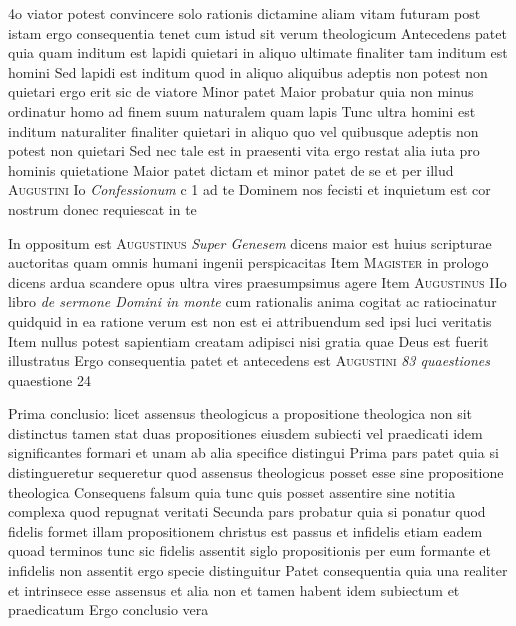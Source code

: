 \documentclass[twoside, openright]{article}
\newcommand{\name}[1]{\textsc{#1}}
\newcommand{\worktitle}[1]{\textit{#1}}
\begin{document}
        \pstart
        4o viator potest convincere solo rationis dictamine aliam vitam futuram post istam ergo consequentia tenet cum istud sit verum theologicum Antecedens patet quia quam inditum est lapidi quietari in aliquo ultimate finaliter tam inditum est homini Sed lapidi est inditum quod in aliquo aliquibus adeptis non potest non quietari ergo erit sic de viatore Minor patet Maior probatur quia non minus ordinatur homo ad finem suum naturalem quam lapis Tunc ultra homini est inditum naturaliter finaliter quietari in aliquo quo vel quibusque adeptis non potest non quietari Sed nec tale est in praesenti vita ergo restat alia iuta pro hominis quietatione Maior patet dictam et minor patet de se et per illud \name{Augustini} Io \worktitle{Confessionum} c 1 ad te Dominem nos fecisti et inquietum est cor nostrum donec requiescat in te
        \pend
     
        \pstart
        In oppositum est \name{Augustinus} \worktitle{Super Genesem}\index[works]{} dicens maior est huius scripturae auctoritas quam omnis humani ingenii perspicacitas Item \name{Magister} in prologo dicens ardua scandere opus ultra vires praesumpsimus agere Item \name{Augustinus} IIo libro \worktitle{de sermone Domini in monte}\index[works]{} cum rationalis anima cogitat ac ratiocinatur quidquid in ea ratione verum est non est ei attribuendum sed ipsi luci veritatis Item nullus potest sapientiam creatam adipisci nisi gratia quae Deus est fuerit illustratus Ergo consequentia patet et antecedens est \name{Augustini} \worktitle{83 quaestiones} quaestione 24
        \pend
     
        \pstart
        Prima conclusio: licet assensus theologicus a propositione theologica non sit distinctus tamen stat duas propositiones eiusdem subiecti vel praedicati idem significantes formari et unam ab alia specifice distingui Prima pars patet quia si distingueretur sequeretur quod assensus theologicus posset esse sine propositione theologica Consequens falsum quia tunc quis posset assentire sine notitia complexa quod repugnat veritati Secunda pars probatur quia si ponatur quod fidelis formet illam propositionem christus est passus et infidelis etiam eadem quoad terminos tunc sic fidelis assentit siglo propositionis per eum formante et infidelis non assentit ergo specie distinguitur Patet consequentia quia una realiter et intrinsece esse assensus et alia non et tamen habent idem subiectum et praedicatum Ergo conclusio vera
        \pend
     
\end{document}
